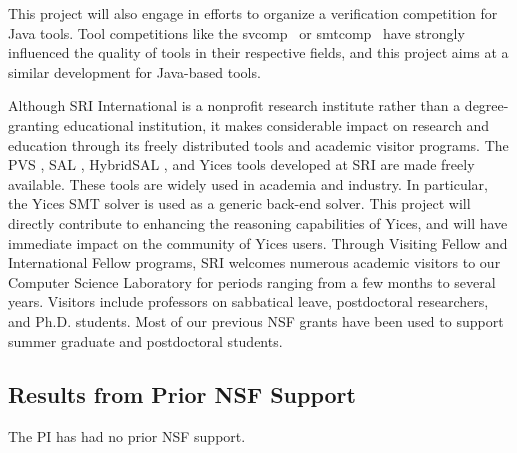 This project will also engage in efforts to organize a verification competition 
for Java tools. Tool competitions like the \textsf{svcomp}~\cite{svcomp} 
or \textsf{smtcomp}~\cite{smtcomp} have strongly influenced the quality of 
tools in their respective fields, and this project aims at a similar development for Java-based tools.

Although SRI International is a nonprofit research institute rather than a degree-granting educational institution, it makes considerable impact on research and education through its freely distributed tools and  academic visitor programs. The PVS \cite{owre1992pvs}, SAL \cite{bensalem2000overview}, HybridSAL \cite{tiwari2012hybridsal}, and Yices \cite{dutertre2014yices} tools developed at SRI are made freely available. These tools are widely used in academia and industry. In particular, the Yices SMT solver is used as a generic back-end solver. This project will directly contribute to enhancing the reasoning capabilities of Yices, and will have immediate impact on the community of Yices users. Through Visiting Fellow and International Fellow programs, SRI welcomes numerous academic visitors to our Computer Science Laboratory for periods ranging from a few months to several years.  Visitors include professors on sabbatical leave, postdoctoral researchers, and Ph.D. students.  Most of our previous NSF grants have been used to support summer graduate  and postdoctoral students.  

\subsection{Results from Prior NSF Support}


%

The PI has had no prior NSF support.